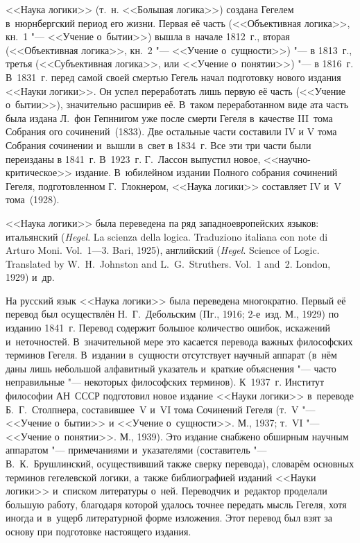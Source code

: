 <<Наука логики>> (т.~н. <<Большая логика>>) создана Гегелем в~нюрнбергский
период его жизни. Первая её часть (<<Объективная логика>>, кн.~1 "--- <<Учение
о~бытии>>) вышла в~начале 1812~г., вторая (<<Объективная логика>>, кн.~2 "---
<<Учение о~сущности>>) "--- в 1813~г., третья (<<Субъективная логика>>, или
<<Учение о~понятии>>) "--- в 1816~г. В~1831~г. перед самой своей смертью Гегель
начал подготовку нового издания <<Науки логики>>. Он успел переработать лишь
первую её часть (<<Учение о~бытии>>), значительно расширив её. В~таком
переработанном виде ата часть была издана Л.~фон Гепннигом уже после смерти
Гегеля в~качестве III~тома Собрания ого сочинений~(1833). Две остальные части
составили IV и V тома Собрания сочинении и~вышли в~свет в 1834~г. Все эти три
части были переизданы в 1841~г. В~1923~г. Г.~Лассон выпустил новое,
<<научно-критическое>> издание. В~юбилейном издании Полного собрания сочинений
Гегеля, подготовленном Г.~Глокнером, <<Наука логики>>
составляет IV и~V тома~(1928).

<<Наука логики>> была переведена па ряд западноевропейских языков: итальянский
({\em Hegel}. La scienza della logica. Traduziono italiana con note di Arturo
Moni. Vol.~1---3. Bari, 1925), английский ({\em Hegel}. Science of Logic.
Translated by W.~H.~Johnston and L.~G.~Struthers. Vol.~1 and~2. London, 1929)
и~др.

На русский язык <<Наука логики>> была переведена многократно. Первый её перевод
был осуществлён Н.~Г.~Дебольским (Пг., 1916; 2-е~изд. М., 1929) по изданию
1841~г. Перевод содержит большое количество ошибок, искажений и~неточностей.
В~значительной мере это касается перевода важных философских терминов Гегеля.
В~издании в~сущности отсутствует научный аппарат (в~нём даны лишь небольшой
алфавитный указатель и~краткие объяснения "--- часто неправильные "---
некоторых философских терминов). К~1937~г. Институт философии АН~СССР
подготовил новое издание <<Науки логики>> в~переводе Б.~Г.~Столпнера,
составившее~V и~VI тома Сочинений Гегеля (т.~V "--- <<Учение о~бытии>> и
<<Учение о~сущности>>. М., 1937; т.~VI "--- <<Учение о~понятии>>. М., 1939).
Это издание снабжено обширным научным аппаратом "--- примечаниями и~указателями
(составитель "--- В.~К.~Брушлинский, осуществивший также сверку перевода),
словарём основных терминов гегелевской логики, а~также библиографией изданий
<<Науки логики>> и~списком литературы о~ней. Переводчик и~редактор проделали
большую работу, благодаря которой удалось точнее передать мысль Гегеля, хотя
иногда и~в~ущерб литературной форме изложения. Этот перевод был взят за основу
при подготовке настоящего издания.

\bigskip

\begin{center}
~~~~~~
\end{center}

\bigskip

\begin{footnotesize}
\printpagenotes
\end{footnotesize}
